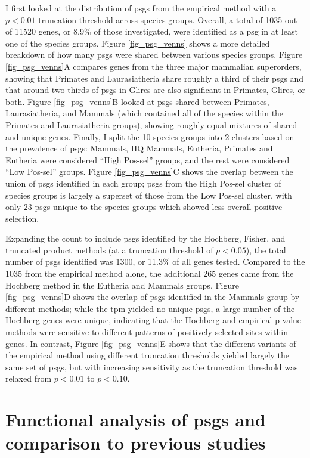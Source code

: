 I first looked at the distribution of \acp{psg} from the empirical
method with a $p<0.01$ truncation threshold across species
groups. Overall, a total of 1035 out of 11520 genes, or 8.9\% of those
investigated, were identified as a \ac{psg} in at least one of the
species groups. Figure \ref{fig_psg_venns} shows a more detailed
breakdown of how many \acp{psg} were shared between various species
groups. Figure \ref{fig_psg_venns}A compares genes from the three
major mammalian superorders, showing that Primates and Laurasiatheria
share roughly a third of their \acp{psg} and that around two-thirds of
\acp{psg} in Glires are also significant in Primates, Glires, or
both. Figure \ref{fig_psg_venns}B looked at \acp{psg} shared between
Primates, Laurasiatheria, and Mammals (which contained all of the
species within the Primates and Laurasiatheria groups), showing
roughly equal mixtures of shared and unique genes. Finally, I split
the 10 species groups into 2 clusters based on the prevalence of
\acp{psg}: Mammals, HQ Mammals, Eutheria, Primates and Eutheria were
considered ``High Pos-sel'' groups, and the rest were considered ``Low
Pos-sel'' groups. Figure \ref{fig_psg_venns}C shows the overlap
between the union of \acp{psg} identified in each group; \acp{psg}
from the High Pos-sel cluster of species groups is largely a superset
of those from the Low Pos-sel cluster, with only 23 \acp{psg} unique
to the species groups which showed less overall positive selection.

Expanding the count to include \acp{psg} identified by the Hochberg,
Fisher, and truncated product methods (at a truncation threshold of
$p<0.05$), the total number of \acp{psg} identified was 1300, or
11.3\% of all genes tested. Compared to the 1035 from the empirical
method alone, the additional 265 genes came from the Hochberg method
in the Eutheria and Mammals groups. Figure \ref{fig_psg_venns}D shows
the overlap of \acp{psg} identified in the Mammals group by different
methods; while the \ac{tpm} yielded no unique \acp{psg}, a large
number of the Hochberg genes were unique, indicating that the Hochberg
and empirical p-value methods were sensitive to different patterns of
positively-selected sites within genes. In contrast, Figure
\ref{fig_psg_venns}E shows that the different variants of the
empirical method using different truncation thresholds yielded largely
the same set of \acp{psg}, but with increasing sensitivity as the
truncation threshold was relaxed from $p<0.01$ to $p<0.10$.

\section{Functional analysis of \acp{psg} and comparison to previous studies}

